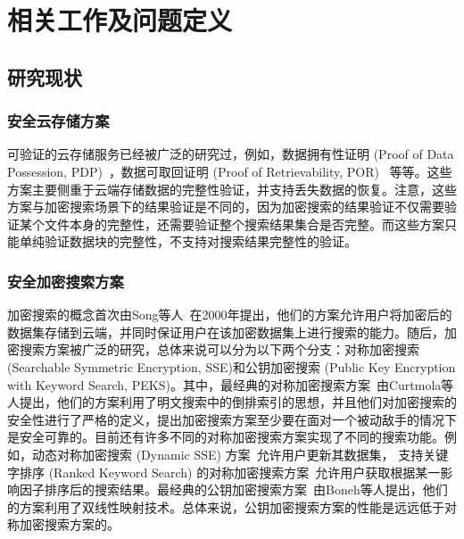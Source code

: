 \chapter{相关工作及问题定义}
\label{cha:related}

\section{研究现状}
\subsection{安全云存储方案}
可验证的云存储服务已经被广泛的研究过，例如，数据拥有性证明 (Proof of Data Possession, PDP)~\cite{ateniese2007provable, ateniese2008scalable, erway2015dynamic,zhu2012cooperative}，数据可取回证明 (Proof of Retrievability, POR)~\cite{juels2007pors, bowers2009proofs, stefanov2012iris} 等等。这些方案主要侧重于云端存储数据的完整性验证，并支持丢失数据的恢复。注意，这些方案与加密搜索场景下的结果验证是不同的，因为加密搜索的结果验证不仅需要验证某个文件本身的完整性，还需要验证整个搜索结果集合是否完整。而这些方案只能单纯验证数据块的完整性，不支持对搜索结果完整性的验证。

\subsection{安全加密搜索方案}
加密搜索的概念首次由Song等人~\cite{song2000practical}在2000年提出，他们的方案允许用户将加密后的数据集存储到云端，并同时保证用户在该加密数据集上进行搜索的能力。随后，加密搜索方案被广泛的研究，总体来说可以分为以下两个分支：对称加密搜索 (Searchable Symmetric Encryption, SSE)和公钥加密搜索 (Public Key Encryption with Keyword Search, PEKS)。其中，最经典的对称加密搜索方案~\cite{curtmola2011searchable}由Curtmola等人提出，他们的方案利用了明文搜索中的倒排索引的思想，并且他们对加密搜索的安全性进行了严格的定义，提出加密搜索方案至少要在面对一个被动敌手的情况下是安全可靠的。目前还有许多不同的对称加密搜索方案实现了不同的搜索功能。例如，动态对称加密搜索 (Dynamic SSE) 方案~\cite{kamara2012dynamic,cash2014dynamic,stefanov2014practical}允许用户更新其数据集， 支持关键字排序 (Ranked Keyword Search) 的对称加密搜索方案~\cite{wang2010secure}允许用户获取根据某一影响因子排序后的搜索结果。最经典的公钥加密搜索方案~\cite{boneh2004public}由Boneh等人提出，他们的方案利用了双线性映射技术。总体来说，公钥加密搜索方案的性能是远远低于对称加密搜索方案的。


